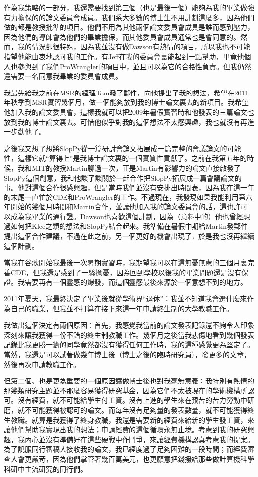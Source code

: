 \documentclass[12pt,UTF8,nofonts]{book}
\begin{document}
作為我策略的一部分，我還需要找到第三個（也是最後一個）能夠為我的畢業做強有力擔保的的論文委員會成員。我們系大多數的博士生不用計劃這麼多，因為他們做的都是教授批準的項目。他們不用為其他兩個論文委員會成員是誰而感到壓力，因為他們的導師會為他們的畢業擔保，而其他委員會成員通常也是會同意的。然而，我的情況卻很特殊，因為我並沒有做Dawson有熱情的項目，所以我也不可能指望他能由衷地認可我的工作。有Jeff在我的委員會裏能起到一點幫助，畢竟他個人也參與到了我們ProWrangler的項目中，並且可以為它的合格性負責。但我仍然還需要一名同意我畢業的委員會成員。

我最先給我之前在MSR的經理Tom發了郵件，向他提出了我的想法，希望在2011年秋季到MSR實習幾個月，做一個能夠放到我的博士論文裏去的新項目。我希望他加入我的論文委員會，這樣我就可以把2009年暑假實習時和他發表的三篇論文也放到我的博士論文裏去。可惜他似乎對我的這個想法不太感興趣，我也就沒有再進一步勸他了。

之後我又想了想將SlopPy從一篇研討會論文拓展成一篇完整的會議論文的可能性，這樣它就“算得上”是我博士論文裏的一個實質性貢獻了。之前在我第五年的時候，我和MIT的教授Martin聊過一次，正是Martin有影響力的論文直接啟發了SlopPy這個創意，我和他談了談關於一起合作把SlopPy拓展成一篇會議論文的事。他對這個合作很感興趣，但是當時我們並沒有安排出時間表，因為我在這一年的末尾一直忙於CDE和ProWrangler的工作。不過現在，我發現如果我能利用第六年開始的幾個月時間和Martin合作，並讓他加入我的論文委員會的話，這也許可以成為我畢業的通行證。Dawson也喜歡這個計劃，因為（意料中的）他也曾經想過如何把Klee之類的想法和SlopPy結合起來。我準備在暑假中期給Martin發郵件提出這個合作建議，不過在此之前，另一個更好的機會出現了，於是我也沒再繼續這個計劃。

當我在谷歌開始我最後一次暑期實習時，我期望我可以在這無憂無慮的三個月裏完善CDE，但我還是感到了一絲擔憂，因為回到學校以後我的畢業問題還是沒有保證。我需要再有一個靈感的爆發，而這個靈感最後來源於一個意想不到的地方。

\breakline

2011年夏天，我最終決定了畢業後就從學術界“退休”：我並不知道我會選什麼來作為自己的職業，但我並不打算在接下來這一年申請終生制的大學教職工作。

我做出這個決定有兩個原因：首先，我感覺我當前的論文發表記錄還不夠令人印象深刻來讓我獲得一份不錯的終生制教職工作。幾個月之後當我悲傷地看到幾個發表記錄比我更勝一籌的同學竟然都沒有獲得任何工作時，我的這種感覺更為堅定了。當然，我還是可以試著做幾年博士後（博士之後的臨時研究員），發更多的文章，然後再次申請教職工作。

但第二個、也是更為重要的一個原因讓做博士後也對我毫無意義：我特別有熱情的那幾類研究主題並不那麼容易獲得研究基金，因為它們不太被現在的學術機構所認可。沒有經費，就不可能給學生付工資。沒有上進的學生來在艱苦的苦力勞動中研磨，就不可能獲得被認可的論文。而每年沒有足夠量的發表數量，就不可能獲得終生教職。就算是我獲得了終身教職，我還是需要新的經費來給新的學生發工資，來讓他們幫助我實現出我的想法；申請經費的這個循環永無止境。考慮到我的研究興趣，我內心並沒有準備好在這些硬戰中作鬥爭，來讓經費機構認真考慮我的提案。為了說服同行審稿人接收我的論文，我已經度過了足夠困難的一段時間；而經費審查人會更嚴苛，因為他們掌管著幾百萬美元，也更願意把錢撥給那些做計算機科學科研中主流研究的同行們。
\end{document}

